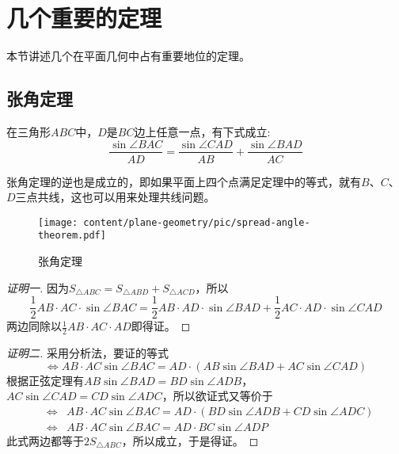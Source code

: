
\section{几个重要的定理}
\label{sec:some-import-plane-geometry-theorem}

本节讲述几个在平面几何中占有重要地位的定理。

\subsection{张角定理}
\label{sec:spread-angle-theorem}

\begin{theorem}[张角定理]
  在三角形$ABC$中，$D$是$BC$边上任意一点，有下式成立:
  \begin{equation}
    \label{eq:spread-angle-theorem}
    \frac{\sin{\angle{BAC}}}{AD} = \frac{\sin{\angle{CAD}}}{AB} + \frac{\sin{\angle{BAD}}}{AC}
  \end{equation}
\end{theorem}

张角定理的逆也是成立的，即如果平面上四个点满足定理中的等式，就有$B$、$C$、$D$三点共线，这也可以用来处理共线问题。

  \begin{figure}[htbp]
  \centering
\texttt{[image: content/plane-geometry/pic/spread-angle-theorem.pdf]}
\caption{张角定理}
\label{fig:spread-angle-theorem}
\end{figure}

\begin{proof}[证明一]
  因为$S_{\triangle ABC} = S_{\triangle ABD} + S_{\triangle ACD}$，所以
  \begin{equation*}
    \frac{1}{2}AB \cdot AC \cdot \sin{\angle BAC} =
    \frac{1}{2}AB \cdot AD \cdot \sin{\angle BAD} +
    \frac{1}{2}AC \cdot AD \cdot \sin{\angle CAD} 
  \end{equation*}
  两边同除以$\frac{1}{2}AB \cdot AC \cdot AD$即得证。
\end{proof}

\begin{proof}[证明二]
  采用分析法，要证的等式
  \begin{equation*}
    \Longleftrightarrow AB \cdot AC \sin{\angle BAC} =
      AD \cdot (AB \sin{\angle BAD + AC \sin{\angle CAD}})
  \end{equation*}
  根据正弦定理有$AB \sin{\angle BAD} = BD \sin{\angle ADB}$，$AC \sin{\angle CAD} = CD \sin{\angle ADC}$，所以欲证式又等价于
  \begin{eqnarray*}
    & \Longleftrightarrow & AB \cdot AC \sin{\angle BAC} =
                            AD \cdot (BD \sin{\angle ADB} + CD \sin{\angle ADC}) \\
    & \Longleftrightarrow & AB \cdot AC \sin{\angle BAC} = AD \cdot BC \sin{\angle ADP}
  \end{eqnarray*}
  此式两边都等于$2S_{\triangle ABC}$，所以成立，于是得证。
\end{proof}


